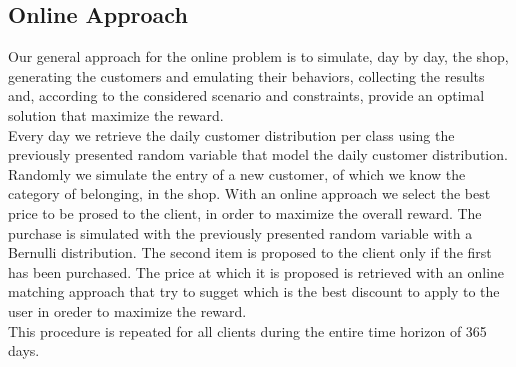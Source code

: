 \subsection*{Online Approach}
Our general approach for the online problem is to simulate, day by day, the shop, generating the customers and emulating their behaviors, collecting the results and, according to the considered scenario and constraints, provide an optimal solution that maximize the reward.\\
Every day we retrieve the daily customer distribution per class using the previously presented random variable that model the daily customer distribution. Randomly we simulate the entry of a new customer, of which we know the category of belonging, in the shop. With an online approach we select the best price to be prosed to the client, in order to maximize the overall reward. The purchase is simulated with the previously presented random variable with a Bernulli distribution.
The second item is proposed to the client only if the first has been purchased. The price at which it is proposed is retrieved with an online matching approach that try to sugget which is the best discount to apply to the user in oreder to maximize the reward.\\
This procedure is repeated for all clients during the entire time horizon of 365 days. 
